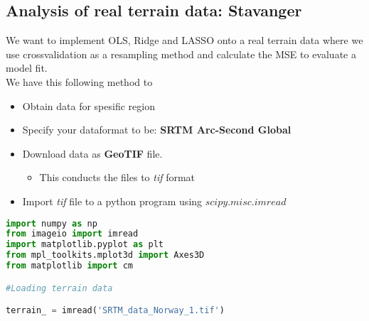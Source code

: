 \documentclass[../main.tex]{subfiles}
\begin{document}
\newpage
\subsection{Analysis of real terrain data: Stavanger}

We want to implement OLS, Ridge and LASSO onto a real terrain data where we use crossvalidation as a resampling method and calculate the MSE to evaluate a model fit.
\\
We have this following method to  
\begin{itemize}
    \item Obtain data for spesific region
    \item Specify your dataformat to be: \textbf{SRTM Arc-Second Global}
    \item Download data as  \textbf{GeoTIF} file.
    \begin{itemize}
        \item This conducts the files to \emph{tif} format
    \end{itemize}
    \item Import \emph{tif} file to a python program using \ensuremath{scipy.misc.imread}
\end{itemize}

\begin{lstlisting}[language=Python]
import numpy as np
from imageio import imread
import matplotlib.pyplot as plt
from mpl_toolkits.mplot3d import Axes3D
from matplotlib import cm

#Loading terrain data

terrain_ = imread('SRTM_data_Norway_1.tif')

\end{lstlisting}
\end{document}
